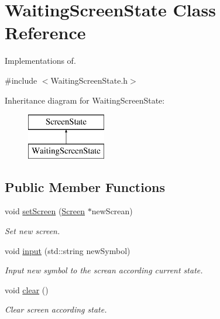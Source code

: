 \hypertarget{class_waiting_screen_state}{}\section{Waiting\+Screen\+State Class Reference}
\label{class_waiting_screen_state}


Implementations of.  




{\ttfamily \#include $<$Waiting\+Screen\+State.\+h$>$}

Inheritance diagram for Waiting\+Screen\+State\+:\begin{figure}[H]
\begin{center}
\leavevmode
\includegraphics[height=2.000000cm]{class_waiting_screen_state}
\end{center}
\end{figure}
\subsection*{Public Member Functions}
\begin{DoxyCompactItemize}
\item 
void \hyperlink{class_waiting_screen_state_a35c29d113f4110d165fffdfe6ef1a57c}{set\+Screen} (\hyperlink{class_screen}{Screen} $\ast$new\+Screan)
\begin{DoxyCompactList}\small\item\em Set new screen. \end{DoxyCompactList}\item 
void \hyperlink{class_waiting_screen_state_ac22e314bd11df4ba4d5480da022f5862}{input} (std\+::string new\+Symbol)
\begin{DoxyCompactList}\small\item\em Input new symbol to the screan according current state. \end{DoxyCompactList}\item 
\hypertarget{class_waiting_screen_state_aa411b1a427f9a112ddaaff80105bbaff}{}void \hyperlink{class_waiting_screen_state_aa411b1a427f9a112ddaaff80105bbaff}{clear} ()\label{class_waiting_screen_state_aa411b1a427f9a112ddaaff80105bbaff}

\begin{DoxyCompactList}\small\item\em Clear screen according state. \end{DoxyCompactList}\end{DoxyCompactItemize}
